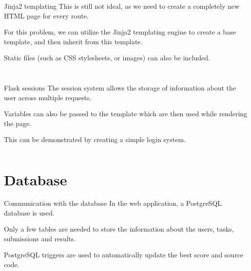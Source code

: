 \documentclass{beamer}
\begin{document}
	\begin{frame}[fragile]
		\small
		\inputminted{python}{examples/2/app.py}
	\end{frame}

	\begin{frame}{Jinja2 templating}
		This is still not ideal, as we need to create a completely new HTML page for every route. \par

		For this problem, we can utilize the Jinja2 templating engine to create a base template, and then inherit from this template.

		Static files (such as CSS stylesheets, or images) can also be included. \par
	\end{frame}

	\begin{frame}[fragile]
		\tiny
		\inputminted{html}{examples/3/templates/base.html}
	\end{frame}

	\begin{frame}[fragile]
		\small
		\inputminted{html}{examples/3/templates/register.html}
	\end{frame}

	\begin{frame}{Flask sessions}
		The session system allows the storage of information about the user across multiple requests. \par

		Variables can also be passed to the template which are then used while rendering the page. \par

		This can be demonstrated by creating a simple login system.
	\end{frame}


	\begin{frame}[fragile]
		\tiny
		\inputminted{python}{examples/4/app.py}
	\end{frame}

	\section{Database}

	\begin{frame}{Communication with the database}
		In the web application, a PostgreSQL database is used. \par

		Only a few tables are needed to store the information about the users, tasks, submissions and results. \par

		PostgreSQL triggers are used to automatically update the best score and source code. 
	\end{frame}
\end{document}
